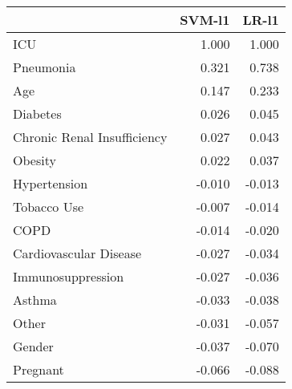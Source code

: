 \begin{tabular}{lrr}
\toprule
{} &  SVM-l1 &  LR-l1 \\
\midrule
ICU                         &   1.000 &  1.000 \\
Pneumonia                   &   0.321 &  0.738 \\
Age                         &   0.147 &  0.233 \\
Diabetes                    &   0.026 &  0.045 \\
Chronic Renal Insufficiency &   0.027 &  0.043 \\
Obesity                     &   0.022 &  0.037 \\
Hypertension                &  -0.010 & -0.013 \\
Tobacco Use                 &  -0.007 & -0.014 \\
COPD                        &  -0.014 & -0.020 \\
Cardiovascular Disease      &  -0.027 & -0.034 \\
Immunosuppression           &  -0.027 & -0.036 \\
Asthma                      &  -0.033 & -0.038 \\
Other                       &  -0.031 & -0.057 \\
Gender                      &  -0.037 & -0.070 \\
Pregnant                    &  -0.066 & -0.088 \\
\bottomrule
\end{tabular}
